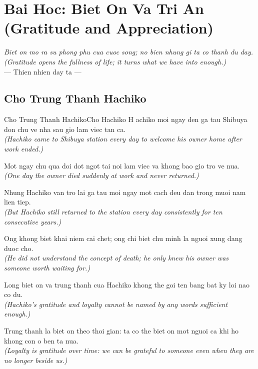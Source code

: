\chapter{Bai Hoc: Biet On Va Tri An (Gratitude and Appreciation)}
\begin{center}
  \textit{\color{truyenblue}Biet on mo ra su phong phu cua cuoc song; no bien nhung gi ta co thanh du day.}\\
  \textit{(Gratitude opens the fullness of life; it turns what we have into enough.)}\\[4pt]
  \small\color{truyengold}--- Thien nhien day ta ---
\end{center}
\ngancach

\section{Cho Trung Thanh Hachiko}
\begin{truyen}{Cho Trung Thanh Hachiko}{Cho Hachiko}
H achiko moi ngay den ga tau Shibuya don chu ve nha sau gio lam viec tan ca.\\
\textit{(Hachiko came to Shibuya station every day to welcome his owner home after work ended.)}

Mot ngay chu qua doi dot ngot tai noi lam viec va khong bao gio tro ve nua.\\
\textit{(One day the owner died suddenly at work and never returned.)}

Nhung Hachiko van tro lai ga tau moi ngay mot cach deu dan trong muoi nam lien tiep.\\
\textit{(But Hachiko still returned to the station every day consistently for ten consecutive years.)}

Ong khong biet khai niem cai chet; ong chi biet chu minh la nguoi xung dang duoc cho.\\
\textit{(He did not understand the concept of death; he only knew his owner was someone worth waiting for.)}

Long biet on va trung thanh cua Hachiko khong the goi ten bang bat ky loi nao co du.\\
\textit{(Hachiko's gratitude and loyalty cannot be named by any words sufficient enough.)}

\end{truyen}
\begin{baihoc}
  Trung thanh la biet on theo thoi gian: ta co the biet on mot nguoi ca khi ho khong con o ben ta nua.\\
  \textit{(Loyalty is gratitude over time: we can be grateful to someone even when they are no longer beside us.)}
\end{baihoc}

